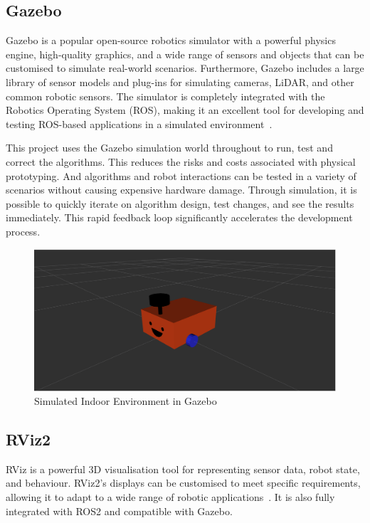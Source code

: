 \subsection{Gazebo}
Gazebo is a popular open-source robotics simulator with a powerful physics engine, high-quality graphics, 
and a wide range of sensors and objects that can be customised to simulate real-world scenarios. 
Furthermore, Gazebo includes a large library of sensor models and plug-ins for simulating cameras, LiDAR, 
and other common robotic sensors. The simulator is completely integrated with the Robotics Operating System (ROS), 
making it an excellent tool for developing and testing ROS-based applications in a simulated environment~\cite{gazebo}. 

This project uses the Gazebo simulation world throughout to run, test and correct the algorithms. 
This reduces the risks and costs associated with physical prototyping. 
And algorithms and robot interactions can be tested in a variety of scenarios without causing expensive hardware damage. 
Through simulation, it is possible to quickly iterate on algorithm design, test changes, and see the results immediately. 
This rapid feedback loop significantly accelerates the development process.
\begin{figure}[H]
    \centering
    \includegraphics[width=0.8\linewidth]{figs/robot.png}
    \caption{Simulated Indoor Environment in Gazebo}
\end{figure}
\subsection{RViz2}
RViz is a powerful 3D visualisation tool for representing sensor data, robot state, and behaviour.
RViz2's displays can be customised to meet specific requirements, 
allowing it to adapt to a wide range of robotic applications~\cite{rviz2}. 
It is also fully integrated with ROS2 and compatible with Gazebo. 

